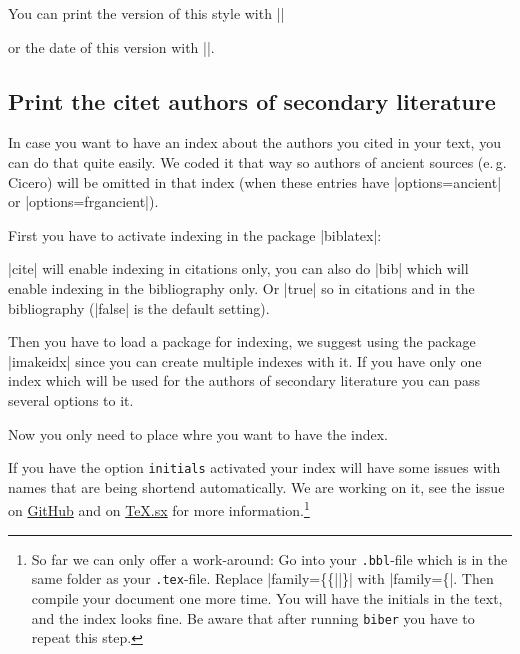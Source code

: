 \documentclass[a4paper,
10pt,
greek,
french,
spanish,
italian,
ngerman,
english
]{ltxdoc}
\begin{document}
You can print the version of this style with |\archaeologieversion| 
\begin{example}
\archaeologieversion
\end{example}
or the date of this version with |\archaeologiedate|.
\begin{example}
\archaeologiedate
\end{example}

\subsection{Print the citet authors of secondary literature}
In case you want to have an index about the authors you cited in your text,
you can do that quite easily.
We coded it that way so authors of ancient sources (e.\,g. Cicero) will be omitted in that index (when these entries have |options={ancient}| or |options={frgancient}|).

First you have to activate indexing in the package |biblatex|:
\begin{code}
\usepackage[style=archaeologie,%
          indexing=cite,
          *@@*]{biblatex}
\end{code}
|cite| will enable indexing in citations only, 
you can also do |bib| which will enable indexing in the bibliography only.
Or |true| so in citations and in the bibliography (|false| is the default setting).

Then you have to load a package for indexing,
we suggest using the package |imakeidx| since you can create multiple indexes with it.
If you have only one index which will be used for the authors of secondary literature you can pass several options to it.
 \begin{code}
\usepackage{imakeidx}
\makeindex[%
  title=Index of  authors,
  columns=3,
]
\end{code}   

Now you only need to place  whre you want to have the index.
\begin{marker}
If you have the option \texttt{initials} activated your index will have some issues with names that are being shortend automatically.\label{initials:index}
We are working on it, see the issue on \href{https://github.com/LukasCBossert/biblatex-archaeologie/issues/97}{GitHub} and on \href{http://tex.stackexchange.com/q/330971/98739}{\TeX.sx} for more information.\footnote{So far we can only offer a work-around:
Go into your \texttt{.bbl}-file which is in the same folder as your \texttt{.tex}-file.
Replace |family=\{\{||\}| with |family=\{|.
Then compile your document one more time. You will have the initials in the text, 
and the index looks fine. 
Be aware that after running \texttt{biber} you have to repeat this step.}
\end{marker}
\end{document}
